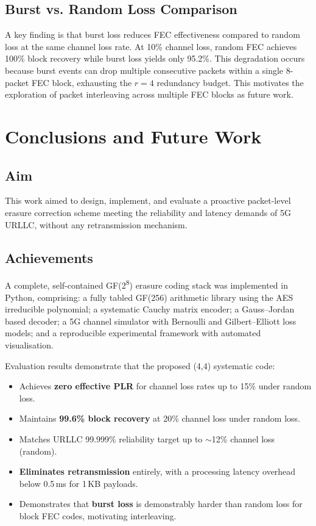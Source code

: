 \documentclass[conference]{IEEEtran}
\begin{document}
\subsection{Burst vs. Random Loss Comparison}

A key finding is that burst loss reduces FEC effectiveness compared to
random loss at the same channel loss rate. At 10\% channel loss, random
FEC achieves 100\% block recovery while burst loss yields only 95.2\%.
This degradation occurs because burst events can drop multiple
consecutive packets within a single 8-packet FEC block, exhausting the
$r=4$ redundancy budget. This motivates the exploration of packet
interleaving across multiple FEC blocks as future work.

\section{Conclusions and Future Work}
\label{sec:conclusion}

\subsection{Aim}

This work aimed to design, implement, and evaluate a proactive
packet-level erasure correction scheme meeting the reliability and
latency demands of 5G URLLC, without any retransmission mechanism.

\subsection{Achievements}

A complete, self-contained GF(2\textsuperscript{8}) erasure coding
stack was implemented in Python, comprising: a fully tabled GF(256)
arithmetic library using the AES irreducible polynomial; a systematic
Cauchy matrix encoder; a Gauss--Jordan based decoder; a 5G channel
simulator with Bernoulli and Gilbert--Elliott loss models; and a
reproducible experimental framework with automated visualisation.

Evaluation results demonstrate that the proposed (4,4) systematic code:
\begin{itemize}
  \item Achieves \textbf{zero effective PLR} for channel loss rates up
        to 15\% under random loss.
  \item Maintains \textbf{99.6\% block recovery} at 20\% channel loss
        under random loss.
  \item Matches URLLC 99.999\% reliability target up to $\sim$12\%
        channel loss (random).
  \item \textbf{Eliminates retransmission} entirely, with a processing
        latency overhead below 0.5\,ms for 1\,KB payloads.
  \item Demonstrates that \textbf{burst loss} is demonstrably harder
        than random loss for block FEC codes, motivating interleaving.
\end{itemize}
\end{document}
